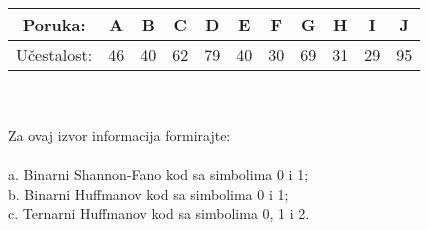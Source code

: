 \documentclass[12pt]{article}
\begin{document}
\begin{enumerate}
\\
\begin{tabular}{|c|c|c|c|c|c|c|c|c|c|c|}
\hline
Poruka:     & A  & B  & C  & D  & E  & F  & G  & H  & I  & J  \\ \hline
Učestalost: & 46 & 40 & 62 & 79 & 40 & 30 & 69 & 31 & 29 & 95 \\ \hline
\end{tabular}
\\
\\
Za ovaj izvor informacija formirajte: \\
\\
a. Binarni Shannon-Fano kod sa simbolima 0 i 1; \\
b. Binarni Huffmanov kod sa simbolima 0 i 1; \\
c. Ternarni Huffmanov kod sa simbolima 0, 1 i 2. \\


\end{enumerate}
\end{document}
